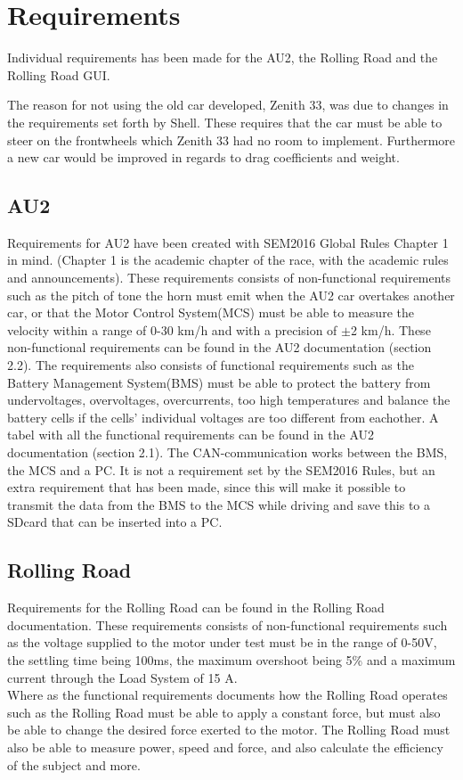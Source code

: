 \chapter{Requirements}
Individual requirements has been made for the AU2, the Rolling Road and the Rolling Road GUI.

The reason for not using the old car developed, Zenith 33, was due to changes in the requirements set forth by Shell. These requires that the car must be able to steer on the frontwheels which Zenith 33 had no room to implement. Furthermore a new car would be improved in regards to drag coefficients and weight.

\section{AU2}
Requirements for AU2 have been created with SEM2016 Global Rules Chapter 1 in mind\cite{ShellRequirements}. (Chapter 1 is the academic chapter of the race, with the academic rules and announcements). These requirements consists of non-functional requirements such as the pitch of tone the horn must emit when the AU2 car overtakes another car, or that the Motor Control System(MCS) must be able to measure the velocity within a range of 0-30 km/h and with a precision of $\pm$2 km/h. These non-functional requirements can be found in the AU2 documentation\cite{AU2} (section 2.2). The requirements also consists of functional requirements such as the Battery Management System(BMS) must be able to protect the battery from undervoltages, overvoltages, overcurrents, too high temperatures and balance the battery cells if the cells' individual voltages are too different from eachother. A tabel with all the functional requirements can be found in the AU2 documentation\cite{AU2} (section 2.1). The CAN-communication works between the BMS, the MCS and a PC. It is not a requirement set by the SEM2016 Rules, but an extra requirement that has been made, since this will make it possible to transmit the data from the BMS to the MCS while driving and save this to a SDcard that can be inserted into a PC.

\section{Rolling Road}
Requirements for the Rolling Road can be found in the Rolling Road documentation\cite{RR}.
These requirements consists of non-functional requirements such as the voltage supplied to the motor under test must be in the range of 0-50V, the settling time being 100ms, the maximum overshoot being 5\% and a maximum current through the Load System of 15 A.\\
Where as the functional requirements documents how the Rolling Road operates such as the Rolling Road must be able to apply a constant force, but must also be able to change the desired force exerted to the motor. The Rolling Road must also be able to measure power, speed and force, and also calculate the efficiency of the subject and more.

